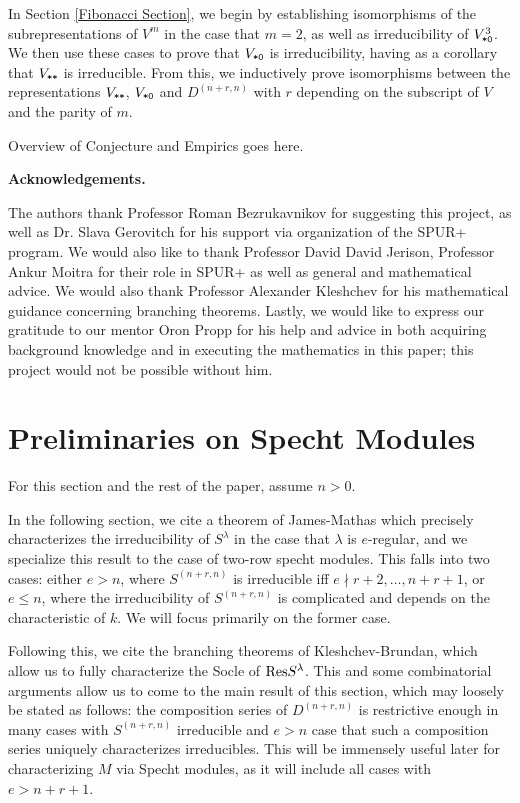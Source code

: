 \documentclass{amsart}
\newcommand{\fakesubsection}[1]{
    \vspace{7pt}
    \noindent \textbf{#1.}
  }
\begin{document}
  In Section \ref{Fibonacci Section}, we begin by establishing isomorphisms of the subrepresentations of $V^m$ in the case that $m = 2$, as well as irreducibility of $V^3_{\texttt{*}\texttt{0}}$.
  We then use these cases to prove that $V_{\texttt{*}\texttt{0}}$ is irreducibility, having as a corollary that $V_{\texttt{*}\texttt{*}}$ is irreducible.
  From this, we inductively prove isomorphisms between the representations $V_{\texttt{*}\texttt{*}}$, $V_{\texttt{*}\texttt{0}}$ and $D^{(n+r,n)}$ with $r$ depending on the subscript of $V$ and the parity of $m$.

  {\color{orange} Overview of Conjecture and Empirics goes here.}

  \fakesubsection{Acknowledgements}
  The authors thank Professor Roman Bezrukavnikov for suggesting this project, as well as Dr. Slava Gerovitch for his support via organization of the SPUR+ program.
  We would also like to thank Professor David David Jerison, Professor Ankur Moitra for their role in SPUR+ as well as general and mathematical advice.
  We would also thank Professor Alexander Kleshchev for his mathematical guidance concerning branching theorems.
  Lastly, we would like to express our gratitude to our mentor Oron Propp for his help and advice in both acquiring background knowledge and in executing the mathematics in this paper;
  this project would not be possible without him.
   
\section{Preliminaries on Specht Modules}\label{Specht Modules Section}
  For this section and the rest of the paper, assume $n > 0$.

  In the following section, we cite a theorem of James-Mathas which precisely characterizes the irreducibility of $S^\lambda$ in the case that $\lambda$ is $e$-regular, and we specialize this result to the case of two-row specht modules.
  This falls into two cases: either $e > n$, where $S^{(n+r,n)}$ is irreducible iff $e \nmid r+2,\dots,n+r+1$, or $e \leq n$, where the irreducibility of $S^{(n+r,n)}$ is complicated and depends on the characteristic of $k$.
  We will focus primarily on the former case.

  Following this, we cite the branching theorems of Kleshchev-Brundan, which allow us to fully characterize the Socle of $\text{Res} S^{\lambda}$.
  This and some combinatorial arguments allow us to come to the main result of this section, which may loosely be stated as follows:
  the composition series of $D^{(n+r,n)}$ is restrictive enough in many cases with $S^{(n+r,n)}$ irreducible and $e > n$ case that such a composition series uniquely characterizes irreducibles.
  This will be immensely useful later for characterizing $M$ via Specht modules, as it will include all cases with $e > n + r + 1$.
\end{document}
